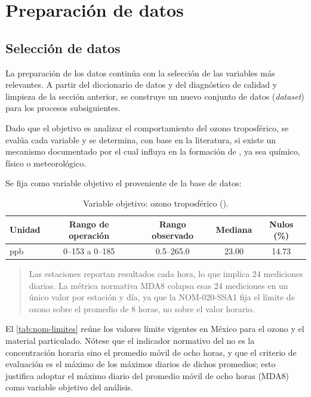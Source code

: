 \section{Preparación de datos}
\label{sec:preparacion-datos}

\subsection{Selección de datos}

La preparación de los datos continúa con la selección de las variables más relevantes. A partir del diccionario de datos y del diagnóstico de calidad y limpieza de la sección anterior, se construye un nuevo conjunto de datos (\textit{dataset}) para los procesos subsiguientes.

Dado que el objetivo es analizar el comportamiento del ozono troposférico, se evalúa cada variable y se determina, con base en la literatura, si existe un mecanismo documentado por el cual influya en la formación de , ya sea químico, físico o meteorológico.

Se fija como variable objetivo el  proveniente de la base de datos:

\begin{table}[t]
  \centering
  \caption{Variable objetivo: ozono troposférico ().}
  \label{tab:variable-objetivo}
  \begin{tabular}{lcccc}
    \toprule
    Unidad & Rango de operación & Rango observado & Mediana & Nulos (\%) \\
    \midrule
    ppb & 0--153 a 0--185 & 0.5--265.0 & 23.00 & 14.73 \\
    \bottomrule
  \end{tabular}
\end{table}

\begin{quote}
    Las estaciones reportan resultados cada hora, lo que implica 24 mediciones diarias. La métrica normativa MDA8 colapsa esas 24 mediciones en un único valor por estación y día, ya que la NOM-020-SSA1 fija el límite de ozono sobre el promedio de 8 horas, no sobre el valor horario.
\end{quote}

El \cref{tab:nom-limites} reúne los valores límite vigentes en México para el
ozono y el material particulado. Nótese que el indicador normativo del  no
es la concentración horaria sino el promedio móvil de ocho horas, y que el
criterio de evaluación es el máximo de los máximos diarios de dichos promedios;
esto justifica adoptar el máximo diario del promedio móvil de ocho horas (MDA8)
como variable objetivo del análisis.

